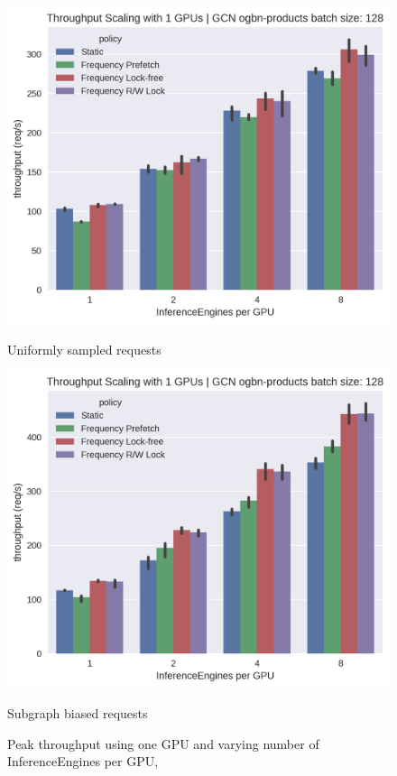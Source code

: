 \begin{figure}[h!]
    \centering
    \begin{minipage}[c]{0.48\textwidth}
        \centering
        \includegraphics[width=\textwidth]{figures/throughput_GCN_uniform_pinnedc0.2_gpus_1.png}
        \caption*{Uniformly sampled requests}
    \end{minipage}
    \hfill
    \begin{minipage}[c]{0.48\textwidth}
        \centering
        \includegraphics[width=\textwidth]{figures/throughput_GCN_bias_0.8_pinnedc0.2_gpus_1.png}    
        \caption*{Subgraph biased requests}
    \end{minipage}
    \caption{Peak throughput using one GPU and varying number of InferenceEngines per GPU,}
    \label{Eval: Throughput 1 GPU}
\end{figure}    

